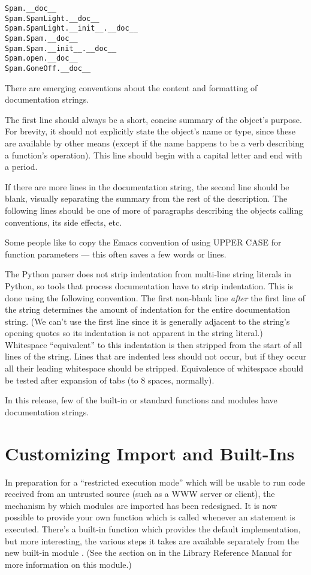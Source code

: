 \begin{verbatim}
Spam.__doc__
Spam.SpamLight.__doc__
Spam.SpamLight.__init__.__doc__
Spam.Spam.__doc__
Spam.Spam.__init__.__doc__
Spam.open.__doc__
Spam.GoneOff.__doc__
\end{verbatim}

There are emerging conventions about the content and formatting of
documentation strings.

The first line should always be a short, concise summary of the
object's purpose.  For brevity, it should not explicitly state the
object's name or type, since these are available by other means
(except if the name happens to be a verb describing a function's
operation).  This line should begin with a capital letter and end with
a period.

If there are more lines in the documentation string, the second line
should be blank, visually separating the summary from the rest of the
description.  The following lines should be one of more of paragraphs
describing the objects calling conventions, its side effects, etc.

Some people like to copy the Emacs convention of using UPPER CASE for
function parameters --- this often saves a few words or lines.

The Python parser does not strip indentation from multi-line string
literals in Python, so tools that process documentation have to strip
indentation.  This is done using the following convention.  The first
non-blank line {\em after} the first line of the string determines the
amount of indentation for the entire documentation string.  (We can't
use the first line since it is generally adjacent to the string's
opening quotes so its indentation is not apparent in the string
literal.)  Whitespace ``equivalent'' to this indentation is then
stripped from the start of all lines of the string.  Lines that are
indented less should not occur, but if they occur all their leading
whitespace should be stripped.  Equivalence of whitespace should be
tested after expansion of tabs (to 8 spaces, normally).

In this release, few of the built-in or standard functions and modules
have documentation strings.


\section{Customizing Import and Built-Ins}

In preparation for a ``restricted execution mode'' which will be
usable to run code received from an untrusted source (such as a WWW
server or client), the mechanism by which modules are imported has
been redesigned.  It is now possible to provide your own function
 which is called whenever an  statement
is executed.  There's a built-in function  which
provides the default implementation, but more interesting, the various
steps it takes are available separately from the new built-in module
.  (See the section on  in the Library Reference
Manual for more information on this module.)

